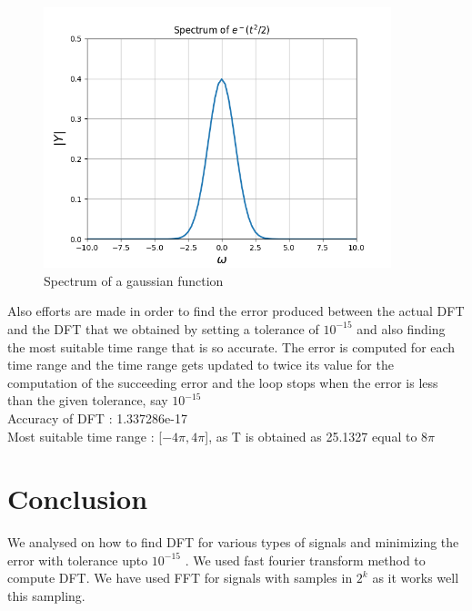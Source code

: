 \documentclass[10pt,a4paper]{article}
\begin{document}
\begin{figure}[!tbh]

\includegraphics[width = 0.9\textwidth]{4- spectrum of gaussian.png}
\caption{Spectrum of a gaussian function}

\end{figure}

Also efforts are made in order to find the error produced between the actual DFT and the DFT that we obtained by setting a tolerance of $10^{-15}$ and also finding the most suitable time range that is so accurate. The error is computed for each time range and the time range gets updated to twice its value for the computation of the succeeding error and the loop stops when the error is less than the given tolerance, say $10^{-15}$ \\

Accuracy of DFT : 1.337286e-17\\
Most suitable time range : [$-4\pi, 4\pi$], as T is obtained as 25.1327 equal to $8\pi$


\section{Conclusion}

We analysed on how to find DFT for various types of signals and minimizing the error with tolerance upto $10^{-15}$ . We used fast fourier transform method to compute DFT. We have used FFT for signals with samples in $2^{k}$ as it works well this sampling.
\end{document}
